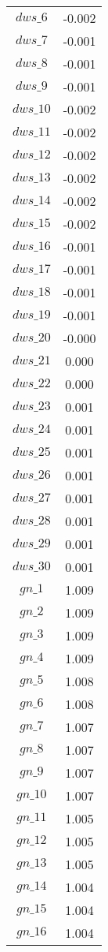 \begin{center}
\begin{longtable}{cc}
$dws\_6$ 	 & 	 -0.002 \\
$dws\_7$ 	 & 	 -0.001 \\
$dws\_8$ 	 & 	 -0.001 \\
$dws\_9$ 	 & 	 -0.001 \\
$dws\_10$ 	 & 	 -0.002 \\
$dws\_11$ 	 & 	 -0.002 \\
$dws\_12$ 	 & 	 -0.002 \\
$dws\_13$ 	 & 	 -0.002 \\
$dws\_14$ 	 & 	 -0.002 \\
$dws\_15$ 	 & 	 -0.002 \\
$dws\_16$ 	 & 	 -0.001 \\
$dws\_17$ 	 & 	 -0.001 \\
$dws\_18$ 	 & 	 -0.001 \\
$dws\_19$ 	 & 	 -0.001 \\
$dws\_20$ 	 & 	 -0.000 \\
$dws\_21$ 	 & 	 0.000 \\
$dws\_22$ 	 & 	 0.000 \\
$dws\_23$ 	 & 	 0.001 \\
$dws\_24$ 	 & 	 0.001 \\
$dws\_25$ 	 & 	 0.001 \\
$dws\_26$ 	 & 	 0.001 \\
$dws\_27$ 	 & 	 0.001 \\
$dws\_28$ 	 & 	 0.001 \\
$dws\_29$ 	 & 	 0.001 \\
$dws\_30$ 	 & 	 0.001 \\
$gn\_1$ 	 & 	 1.009 \\
$gn\_2$ 	 & 	 1.009 \\
$gn\_3$ 	 & 	 1.009 \\
$gn\_4$ 	 & 	 1.009 \\
$gn\_5$ 	 & 	 1.008 \\
$gn\_6$ 	 & 	 1.008 \\
$gn\_7$ 	 & 	 1.007 \\
$gn\_8$ 	 & 	 1.007 \\
$gn\_9$ 	 & 	 1.007 \\
$gn\_10$ 	 & 	 1.007 \\
$gn\_11$ 	 & 	 1.005 \\
$gn\_12$ 	 & 	 1.005 \\
$gn\_13$ 	 & 	 1.005 \\
$gn\_14$ 	 & 	 1.004 \\
$gn\_15$ 	 & 	 1.004 \\
$gn\_16$ 	 & 	 1.004 \\

\end{longtable}
\end{center}

